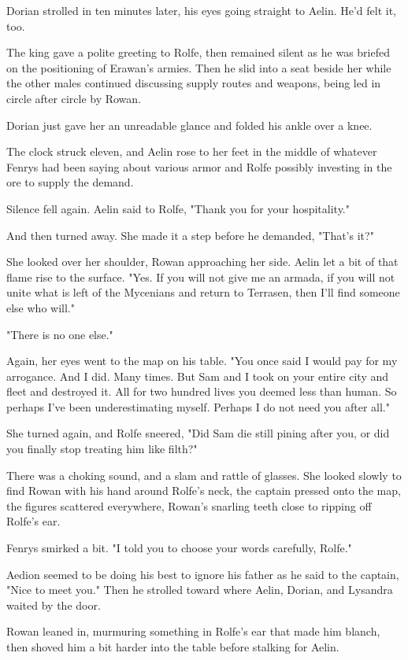 Dorian strolled in ten minutes later, his eyes going straight to Aelin.
He'd felt it, too.

The king gave a polite greeting to Rolfe, then remained silent as he was briefed on the positioning of Erawan's armies.
Then he slid into a seat beside her while the other males continued discussing supply routes and weapons, being led in circle after circle by Rowan.

Dorian just gave her an unreadable glance and folded his ankle over a knee.

The clock struck eleven, and Aelin rose to her feet in the middle of whatever Fenrys had been saying about various armor and Rolfe possibly investing in the ore to supply the demand.

Silence fell again.
Aelin said to Rolfe, "Thank you for your hospitality."

And then turned away.
She made it a step before he demanded, "That's it?"

She looked over her shoulder, Rowan approaching her side.
Aelin let a bit of that flame rise to the surface.
"Yes.
If you will not give me an armada, if you will not unite what is left of the Mycenians and return to Terrasen, then I'll find someone else who will."

"There is no one else."

Again, her eyes went to the map on his table.
"You once said I would pay for my arrogance.
And I did.
Many times.
But Sam and I took on your entire city and fleet and destroyed it.
All for two hundred lives you deemed less than human.
So perhaps I've been underestimating myself.
Perhaps I do not need you after all."

She turned again, and Rolfe sneered, "Did Sam die still pining after you, or did you finally stop treating him like filth?"

There was a choking sound, and a slam and rattle of glasses.
She looked slowly to find Rowan with his hand around Rolfe's neck, the captain pressed onto the map, the figures scattered everywhere, Rowan's snarling teeth close to ripping off Rolfe's ear.

Fenrys smirked a bit.
"I told you to choose your words carefully, Rolfe."

Aedion seemed to be doing his best to ignore his father as he said to the captain, "Nice to meet you."
Then he strolled toward where Aelin, Dorian, and Lysandra waited by the door.

Rowan leaned in, murmuring something in Rolfe's ear that made him blanch, then shoved him a bit harder into the table before stalking for Aelin.


